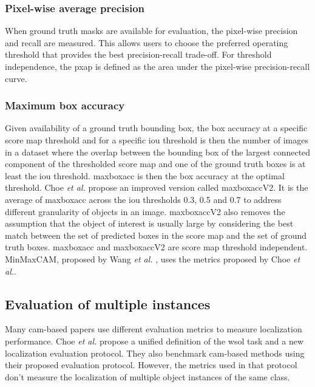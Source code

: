 \subsubsection{Pixel-wise average precision}
When ground truth masks are available for evaluation, the pixel-wise precision and recall \cite{achanta2009frequency} are measured. This allows users to choose the preferred operating threshold that provides the best precision-recall trade-off. For threshold independence, the \acrfull{pxap} is defined as the area under the pixel-wise precision-recall curve.

\subsubsection{Maximum box accuracy}
Given availability of a ground truth bounding box, the box accuracy at a specific score map threshold and for a specific \acrshort{iou} threshold is then the number of images in a dataset where the overlap  between the bounding box of the largest connected component of the thresholded score map and one of the ground truth boxes is at least the \acrshort{iou} threshold. \acrshort{maxboxacc} is then the box accuracy at the optimal threshold. Choe \textit{et al.} \cite{choe2020evaluating} propose an improved version called \acrshort{maxboxacc}V2. It is the average of \acrshort{maxboxacc} across the \acrshort{iou} thresholds 0.3, 0.5 and 0.7 to address different granularity of objects in an image. \acrshort{maxboxacc}V2 also removes the assumption that the object of interest is usually large by considering the best match between the set of predicted boxes in the score map and the set of ground truth boxes. \acrshort{maxboxacc} and \acrshort{maxboxacc}V2 are score map threshold independent. MinMaxCAM, proposed by Wang \textit{et al.} \cite{wang2021minmaxcam}, uses the metrics proposed by Choe \textit{et al.}.

\subsection{Evaluation of multiple instances}
Many \acrshort{cam}-based papers use different evaluation metrics to measure localization performance. Choe \textit{et al.} \cite{choe2020evaluating} propose a unified definition of the \acrshort{wsol} task and a new localization evaluation protocol. They also benchmark \acrshort{cam}-based methods using their proposed evaluation protocol. However, the metrics used in that protocol don't measure the localization of multiple object instances of the same class.

